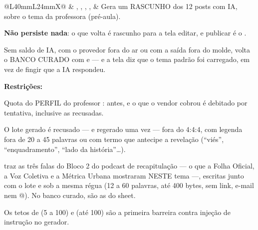 \begin{tabularx}{\linewidth}{@{}L{40mm}L{24mm}X@{}}
\zebra {} & , , , ,  & Gera um RASCUNHO dos 12 posts com IA, sobre o tema da professora (pré-aula).\par \textbf{Não persiste nada}: o que volta é rascunho para a tela editar, e publicar é o .\par Sem saldo de IA, com o provedor fora do ar ou com a saída fora do molde, volta o BANCO CURADO com  e  --- e a tela diz que o tema padrão foi carregado, em vez de fingir que a IA respondeu.\par \textbf{Restrições:}\par \hspace*{1em}\textbullet{} Quota do PERFIL do professor :  antes, e o que o vendor cobrou é debitado por tentativa, inclusive as recusadas.\par \hspace*{1em}\textbullet{} O lote gerado é recusado --- e regerado uma vez --- fora do 4:4:4, com legenda fora de 20 a 45 palavras ou com termo que antecipe a revelação (\enquote{viés}, \enquote{enquadramento}, \enquote{lado da história}\ldots{}).\par \hspace*{1em}\textbullet{}  traz as três falas do Bloco 2 do podcast de recapitulação --- o que a Folha Oficial, a Voz Coletiva e a Métrica Urbana mostraram NESTE tema ---, escritas junto com o lote e sob a mesma régua (12 a 60 palavras, até 400 bytes, sem link, e-mail nem @). No banco curado, são as do sheet.\par \hspace*{1em}\textbullet{} Os tetos de  (5 a 100) e  (até 100) são a primeira barreira contra injeção de instrução no gerador.\\

\end{tabularx}
